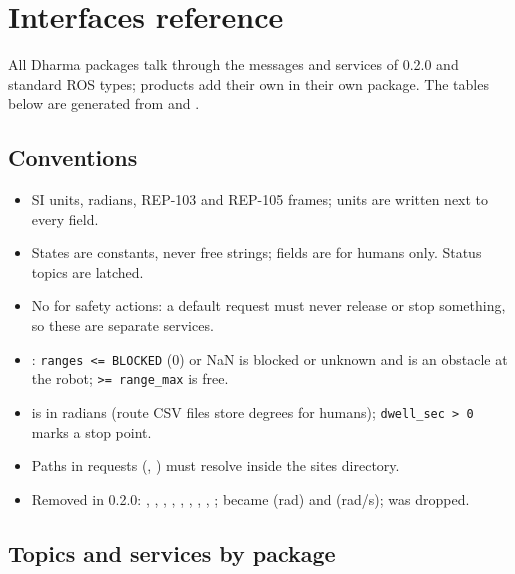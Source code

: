 \chapter{Interfaces reference}
\label{ch:interfaces}

All Dharma packages talk through the messages and services of  0.2.0 and
standard ROS types; products add their own in their own package. The tables below are generated
from  and .

\section{Conventions}

\begin{itemize}
  \item SI units, radians, REP-103 and REP-105 frames; units are written next to every field.
  \item States are  constants, never free strings;  fields are for humans
    only. Status topics are latched.
  \item No  for safety actions: a default request must never release or stop
    something, so these are separate  services.
  \item {}: \texttt{ranges <= BLOCKED} (0) or NaN is blocked or unknown and is an
    obstacle at the robot; \texttt{>= range\_max} is free.
  \item {} is in radians (route CSV files store degrees for humans);
    \texttt{dwell\_sec > 0} marks a stop point.
  \item Paths in requests (, ) must resolve inside the sites
    directory.
  \item Removed in 0.2.0: , , , ,
    , , , , ;
     became  (rad) and
     (rad/s);  was dropped.
\end{itemize}

\section{Topics and services by package}

